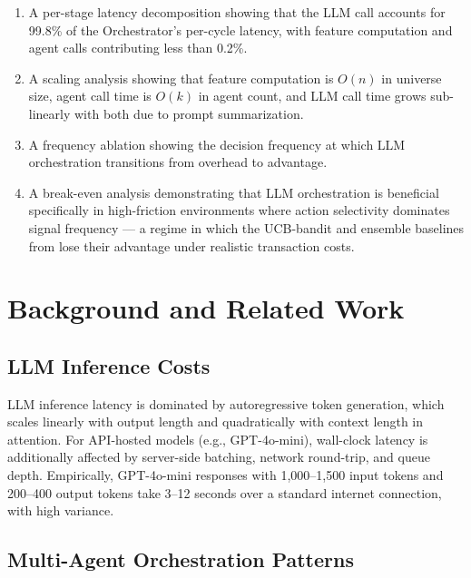 \documentclass[10pt,conference]{IEEEtran}
\begin{document}
\begin{enumerate}
    \item A per-stage latency decomposition showing that the LLM call accounts for 99.8\% of the Orchestrator's per-cycle latency, with feature computation and agent calls contributing less than 0.2\%.

    \item A scaling analysis showing that feature computation is $O(n)$ in universe size, agent call time is $O(k)$ in agent count, and LLM call time grows sub-linearly with both due to prompt summarization.

    \item A frequency ablation showing the decision frequency at which LLM orchestration transitions from overhead to advantage.

    \item A break-even analysis demonstrating that LLM orchestration is beneficial specifically in high-friction environments where action selectivity dominates signal frequency --- a regime in which the UCB-bandit and ensemble baselines from \cite{companion} lose their advantage under realistic transaction costs.
\end{enumerate}


\section{Background and Related Work}

\subsection{LLM Inference Costs}

LLM inference latency is dominated by autoregressive token generation, which scales linearly with output length and quadratically with context length in attention. For API-hosted models (e.g., GPT-4o-mini), wall-clock latency is additionally affected by server-side batching, network round-trip, and queue depth. Empirically, GPT-4o-mini responses with 1,000--1,500 input tokens and 200--400 output tokens take 3--12 seconds over a standard internet connection, with high variance.

\subsection{Multi-Agent Orchestration Patterns}
\end{document}
